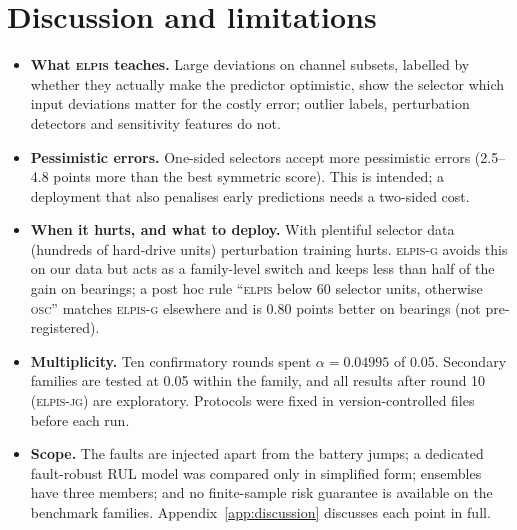 \documentclass{esannV2}
\newcommand{\OSC}{\textsc{osc}}
\newcommand{\RPT}{\textsc{elpis}}
\newcommand{\AUTOD}{\textsc{elpis-g}}
\newcommand{\EJG}{\textsc{elpis-jg}}
\begin{document}
\section{Discussion and limitations}
\begin{itemize}
\item \textbf{What \RPT{} teaches.} Large deviations on channel subsets, labelled by whether they actually make the predictor optimistic, show the selector which input deviations matter for the costly error; outlier labels, perturbation detectors and sensitivity features do not.
\item \textbf{Pessimistic errors.} One-sided selectors accept more pessimistic errors (2.5--4.8 points more than the best symmetric score). This is intended; a deployment that also penalises early predictions needs a two-sided cost.
\item \textbf{When it hurts, and what to deploy.} With plentiful selector data (hundreds of hard-drive units) perturbation training hurts. \AUTOD{} avoids this on our data but acts as a family-level switch and keeps less than half of the gain on bearings; a post hoc rule ``\RPT{} below 60 selector units, otherwise \OSC'' matches \AUTOD{} elsewhere and is 0.80 points better on bearings (not pre-registered).
\item \textbf{Multiplicity.} Ten confirmatory rounds spent $\alpha=0.04995$ of 0.05. Secondary families are tested at 0.05 within the family, and all results after round 10 (\EJG) are exploratory. Protocols were fixed in version-controlled files before each run.
\item \textbf{Scope.} The faults are injected apart from the battery jumps; a dedicated fault-robust RUL model was compared only in simplified form; ensembles have three members; and no finite-sample risk guarantee is available on the benchmark families. Appendix~\ref{app:discussion} discusses each point in full.
\end{itemize}

\FloatBarrier
\end{document}
